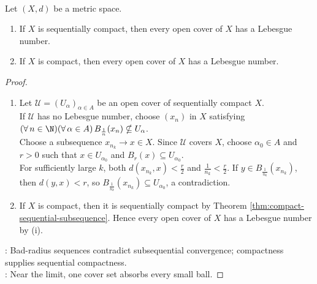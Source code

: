 \begin{lemma} \label{lem:lebesgue-covering-lemma} \\
Let $(X,d)$ be a metric space.
\begin{enumerate}[label=(\roman*)]
\setlength{\itemsep}{0pt}
\item If $X$ is sequentially compact, then every open cover of $X$ has a Lebesgue number.
\item If $X$ is compact, then every open cover of $X$ has a Lebesgue number.
\end{enumerate}
\begin{proof}
\begin{enumerate}[label=(\roman*)]
\setlength{\itemsep}{0pt}
\item Let $\mathcal{U}=(U_\alpha)_{\alpha\in A}$ be an open cover of sequentially compact $X$.\\
If $\mathcal{U}$ has no Lebesgue number, choose $(x_n)$ in $X$ satisfying $(\forall\,n\in\N)(\forall\,\alpha\in A)\,B_{\frac{1}{n}}(x_n)\nsubseteq U_\alpha$.\\
Choose a subsequence $x_{n_k}\to x\in X$. Since $\mathcal{U}$ covers $X$, choose $\alpha_0\in A$ and $r>0$ such that $x\in U_{\alpha_0}$ and $B_r(x)\subseteq U_{\alpha_0}$.\\
For sufficiently large $k$, both $d(x_{n_k},x)<\frac{r}{2}$ and $\frac{1}{n_k}<\frac{r}{2}$. If $y\in B_{\frac{1}{n_k}}(x_{n_k})$, then $d(y,x)<r$, so $B_{\frac{1}{n_k}}(x_{n_k})\subseteq U_{\alpha_0}$, a contradiction.
\item If $X$ is compact, then it is sequentially compact by Theorem \ref{thm:compact-sequential-subsequence}. Hence every open cover of $X$ has a Lebesgue number by (i).
\end{enumerate}
: Bad-radius sequences contradict subsequential convergence; compactness supplies sequential compactness.\\
: Near the limit, one cover set absorbs every small ball.
\end{proof}
\end{lemma}

